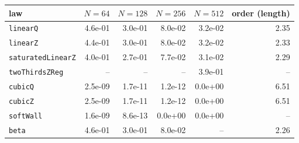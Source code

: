 \begin{tabular}{lrrrrr}
\toprule
law & $N{=}64$ & $N{=}128$ & $N{=}256$ & $N{=}512$ & order (length) \\
\midrule
\texttt{linearQ} & 4.6e-01 & 3.0e-01 & 8.0e-02 & 3.2e-02 & 2.35 \\
\texttt{linearZ} & 4.4e-01 & 3.0e-01 & 8.0e-02 & 3.2e-02 & 2.33 \\
\texttt{saturatedLinearZ} & 4.0e-01 & 2.7e-01 & 7.7e-02 & 3.1e-02 & 2.29 \\
\texttt{twoThirdsZReg} & -- & -- & -- & 3.9e-01 & -- \\
\texttt{cubicQ} & 2.5e-09 & 1.7e-11 & 1.2e-12 & 0.0e+00 & 6.51 \\
\texttt{cubicZ} & 2.5e-09 & 1.7e-11 & 1.2e-12 & 0.0e+00 & 6.51 \\
\texttt{softWall} & 1.6e-09 & 8.6e-13 & 0.0e+00 & 0.0e+00 & -- \\
\texttt{beta} & 4.6e-01 & 3.0e-01 & 8.0e-02 & -- & 2.26 \\
\bottomrule
\end{tabular}
